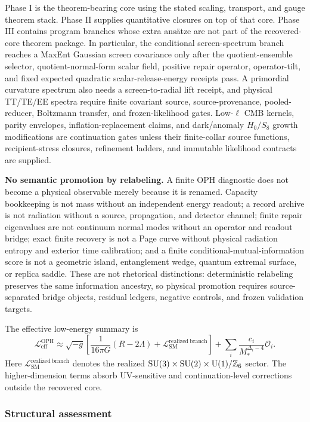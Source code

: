Phase I is the theorem-bearing core using the stated scaling, transport, and gauge theorem stack.
Phase II supplies quantitative closures on top of that core. Phase III contains
program branches whose extra ans\"atze are not part of the recovered-core theorem package. In
particular, the conditional screen-spectrum branch reaches a MaxEnt Gaussian screen covariance only
after the quotient-ensemble selector, quotient-normal-form scalar field, positive repair operator,
operator-tilt, and fixed expected quadratic scalar-release-energy receipts pass. A primordial
curvature spectrum also needs a screen-to-radial lift receipt, and physical TT/TE/EE spectra require
finite covariant source, source-provenance, pooled-reducer, Boltzmann transfer, and frozen-likelihood gates.
Low-\(\ell\) CMB kernels, parity envelopes, inflation-replacement claims, and dark/anomaly
\(H_0/S_8\) growth modifications are continuation gates unless their finite-collar source functions,
recipient-stress closures, refinement ladders, and immutable likelihood contracts are supplied.

\textbf{No semantic promotion by relabeling.} A finite OPH diagnostic does not
become a physical observable merely because it is renamed. Capacity bookkeeping
is not mass without an independent energy readout; a record archive is not
radiation without a source, propagation, and detector channel; finite repair
eigenvalues are not continuum normal modes without an operator and readout
bridge; exact finite recovery is not a Page curve without physical radiation
entropy and exterior time calibration; and a finite conditional-mutual-information
score is not a geometric island, entanglement wedge, quantum extremal surface, or
replica saddle. These are not rhetorical distinctions: deterministic relabeling
preserves the same information ancestry, so physical promotion requires
source-separated bridge objects, residual ledgers, negative controls, and frozen
validation targets.

The effective low-energy summary is
\[
\mathcal L_{\mathrm{eff}}^{\mathrm{OPH}}
\approx
\sqrt{-g}\left[
\frac{1}{16\pi G}(R-2\Lambda)
+
\mathcal L_{\mathrm{SM}}^{\mathrm{realized\ branch}}
\right]
+
\sum_i \frac{c_i}{M_*^{\Delta_i-4}}\mathcal O_i.
\]
Here \(\mathcal L_{\mathrm{SM}}^{\mathrm{realized\ branch}}\) denotes the realized
\(\mathrm{SU}(3)\times\mathrm{SU}(2)\times\mathrm{U}(1)/\mathbb Z_6\) sector. The higher-dimension terms absorb
UV-sensitive and continuation-level corrections outside the recovered core.
\subsubsection{Structural assessment}\label{82-structural-assessment}


